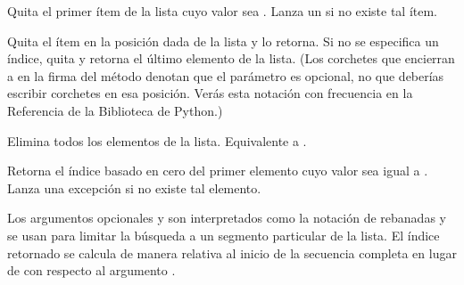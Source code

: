 \documentclass[a4,10pt,spanish]{sphinxmanual}
\begin{document}
\begin{fulllineitems}
\sphinxAtStartPar
Quita el primer ítem de la lista cuyo valor sea . Lanza un  si no existe tal ítem.

\end{fulllineitems}



\begin{fulllineitems}
\sphinxAtStartPar
Quita el ítem en la posición dada de la lista y lo retorna. Si no se especifica un índice,  quita y retorna el último elemento de la lista. (Los corchetes que encierran a  en la firma del método denotan que el parámetro es opcional, no que deberías escribir corchetes en esa posición. Verás esta notación con frecuencia en la Referencia de la Biblioteca de Python.)

\end{fulllineitems}



\begin{fulllineitems}
\sphinxAtStartPar
Elimina todos los elementos de la lista. Equivalente a .

\end{fulllineitems}



\begin{fulllineitems}
\sphinxAtStartPar
Retorna el índice basado en cero del primer elemento cuyo valor sea igual a . Lanza una excepción  si no existe tal elemento.

\sphinxAtStartPar
Los argumentos opcionales  y  son interpretados como la notación de rebanadas y se usan para limitar la búsqueda a un segmento particular de la lista. El índice retornado se calcula de manera relativa al inicio de la secuencia completa en lugar de con respecto al argumento .

\end{fulllineitems}
\end{document}
